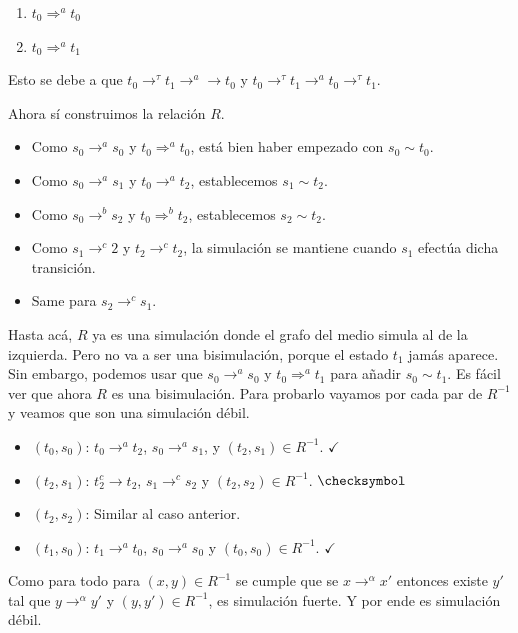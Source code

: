 \documentclass[a4paper, 12pt]{article}
\begin{document}
\begin{enumerate}
    \item $t_0 \Rightarrow^a t_0$
    \item $t_0 \Rightarrow^a t_1$
\end{enumerate}

Esto se debe a que $t_0 \to^\tau t_1 \to^a \to t_0$ y
$t_0 \to^\tau t_1 \to^a t_0 \to^\tau t_1$. 

Ahora sí construimos la relación $R$.

\begin{itemize}
    \item Como $s_0 \to^a s_0$ y $t_0 \Rightarrow^a t_0$, está bien haber
        empezado con $s_0 \sim t_0$.
    \item Como $s_0 \to^a s_1$ y $t_0 \to^a t_2$, establecemos $s_1 \sim t_2$.
    \item Como $s_0 \to^b s_2$ y $t_0 \Rightarrow^b t_2$, establecemos $s_2 \sim
        t_2$.
    \item Como $s_1 \to^c 2$ y $t_2 \to^c t_2$, la simulación se mantiene cuando
        $s_1$ efectúa dicha transición.
    \item Same para $s_2 \to^c s_1$.
\end{itemize}

Hasta acá, $R$ ya es una simulación donde el grafo del medio simula al de la
izquierda. Pero no va a ser una bisimulación, porque el estado $t_1$ jamás
aparece. Sin embargo, podemos usar que $s_0 \to^a s_0$ y $t_0 \Rightarrow^a
t_1$ para añadir $s_0 \sim t_1$. Es fácil ver que ahora $R$ es una bisimulación.
Para probarlo vayamos por cada par de $R^{-1}$ y veamos que son una simulación
débil.

\begin{itemize}
    \item $(t_0, s_0)$: $t_0 \to^a t_2$, $s_0 \to^a s_1$, y $(t_2, s_1) \in
        R^{-1}$. $\checkmark$
    \item $(t_2, s_1)$: $t_2^c \to t_2$, $s_1 \to^c s_2$ y $(t_2, s_2) \in R^{-1}$.
        $\checksymbol$
    \item $(t_2, s_2)$: Similar al caso anterior.
    \item  $(t_1, s_0)$: $t_1 \to^a t_0$, $s_0 \to^a s_0$ y $(t_0, s_0) \in
        R^{-1}$. $\checkmark$
\end{itemize}

Como para todo para $(x, y) \in R^{-1}$ se cumple que se $x \to^\alpha x'$ entonces
existe $y'$ tal que $y \to^\alpha y'$ y $(y, y') \in R^{-1}$, es simulación
fuerte. Y por ende es simulación débil. 
\end{document}
